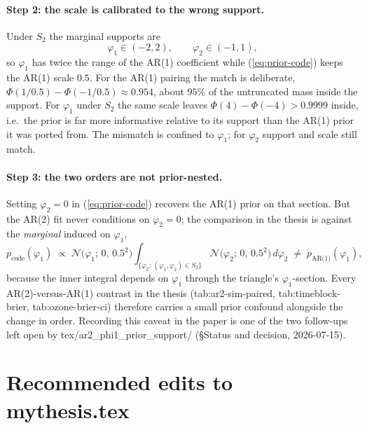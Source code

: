 \documentclass[11pt]{article}
\newcommand{\Norm}{\mathcal{N}}
\DeclareRobustCommand{\code}[1]{\texttt{#1}}
\newcommand{\eref}[1]{(\ref{#1})}
\def\code#1{#1}%
\theoremstyle{plain}
\theoremstyle{definition}
\theoremstyle{remark}
\begin{document}
\paragraph{Step 2: the scale is calibrated to the wrong support.}
Under $S_2$ the marginal supports are
\begin{equation}\label{eq:supports}
  \varphi_1 \in (-2, 2), \qquad \varphi_2 \in (-1, 1),
\end{equation}
so $\varphi_1$ has twice the range of the AR(1) coefficient while
\eref{eq:prior-code} keeps the AR(1) scale $0.5$. For the AR(1) pairing the
match is deliberate, $\Phi(1/0.5) - \Phi(-1/0.5) \approx 0.954$, about $95\%$
of the untruncated mass inside the support. For $\varphi_1$ under $S_2$ the
same scale leaves $\Phi(4) - \Phi(-4) > 0.9999$ inside, i.e.\ the prior is far
more informative relative to its support than the AR(1) prior it was ported
from. The mismatch is confined to $\varphi_1$; for $\varphi_2$ support and
scale still match.

\paragraph{Step 3: the two orders are not prior-nested.}
Setting $\varphi_2 = 0$ in \eref{eq:prior-code} recovers the AR(1) prior on
that section. But the AR(2) fit never conditions on $\varphi_2 = 0$; the
comparison in the thesis is against the \emph{marginal} induced on
$\varphi_1$,
\begin{equation}\label{eq:marginal}
  p_{\text{code}}(\varphi_1)
  \;\propto\;
  \Norm\bigl(\varphi_1;\, 0,\, 0.5^2\bigr)
  \int_{\{\varphi_2 :\, (\varphi_1,\varphi_2) \in S_2\}}
  \Norm\bigl(\varphi_2;\, 0,\, 0.5^2\bigr)\, d\varphi_2
  \;\ne\;
  p_{\text{AR(1)}}(\varphi_1),
\end{equation}
because the inner integral depends on $\varphi_1$ through the triangle's
$\varphi_1$-section. Every AR(2)-versus-AR(1) contrast in the thesis
(\code{tab:ar2-sim-paired}, \code{tab:timeblock-brier},
\code{tab:ozone-brier-ci}) therefore carries a small prior confound alongside
the change in order. Recording this caveat in the paper is one of the two
follow-ups left open by \code{tex/ar2\_phi1\_prior\_support/}
(\S Status and decision, 2026-07-15).

\section{Recommended edits to \code{mythesis.tex}}
\label{sec:edits}
\end{document}
